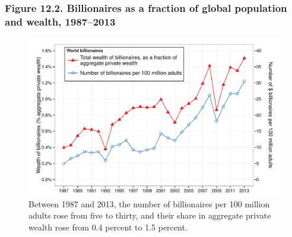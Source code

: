 \documentclass[t]{beamer}\usepackage[]{graphicx}\usepackage[]{color}
\newenvironment{knitrout}{}{} %
\begin{document}
\begin{frame}[label=Figure_12_2]
\frametitle{Figure 12.2. Billionaires as a fraction of global population and wealth, 1987--2013}
\begin{figure}[t]
\begin{minipage}[b]{\textwidth}
\centering

\begin{knitrout}\footnotesize
{}\color{fgcolor}

{\centering \includegraphics[width=1\linewidth]{figures/color/Figure_12_2} 

}



\end{knitrout}
\caption{Between 1987 and 2013, the number of billionaires per 100 million adults rose from five to thirty, and their share in aggregate private wealth rose from 0.4 percent to 1.5 percent.}
\end{minipage}
\end{figure}
\end{frame}
\end{document}
